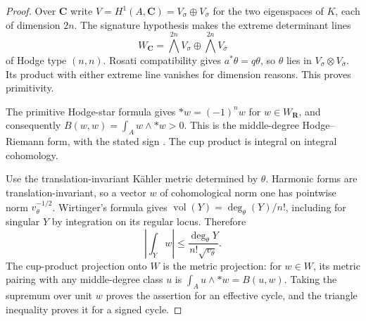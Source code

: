 \documentclass[11pt]{article}
\theoremstyle{definition}
\theoremstyle{remark}
\newcommand{\R}{\mathbf R}
\newcommand{\C}{\mathbf C}
\begin{document}
\begin{proof}
Over $\C$ write $V=H^1(A,\C)=V_\sigma\oplus V_{\bar\sigma}$ for the two eigenspaces of $K$, each of dimension $2n$. The signature hypothesis makes the extreme determinant lines
\[
 W_\C=\bigwedge^{2n}V_\sigma\oplus\bigwedge^{2n}V_{\bar\sigma}
\]
of Hodge type $(n,n)$. Rosati compatibility gives $a^*\theta=q\theta$, so $\theta$ lies in $V_\sigma\otimes V_{\bar\sigma}$. Its product with either extreme line vanishes for dimension reasons. This proves primitivity.

The primitive Hodge-star formula gives $*w=(-1)^nw$ for $w\in W_\R$, and consequently $B(w,w)=\int_A w\wedge*w>0$. This is the middle-degree Hodge--Riemann form, with the stated sign \cite[Theorem~5.42 and (5.43)]{Ballmann}. The cup product is integral on integral cohomology.

Use the translation-invariant K\"ahler metric determined by $\theta$. Harmonic forms are translation-invariant, so a vector $w$ of cohomological norm one has pointwise norm $v_\theta^{-1/2}$. Wirtinger's formula gives $\operatorname{vol}(Y)=\deg_\theta(Y)/n!$, including for singular $Y$ by integration on its regular locus. Therefore
\[
 \left|\int_Yw\right|\leq\frac{\deg_\theta Y}{n!\sqrt{v_\theta}}.
\]
The cup-product projection onto $W$ is the metric projection: for $w\in W$, its metric pairing with any middle-degree class $u$ is $\int_Au\wedge*w=B(u,w)$. Taking the supremum over unit $w$ proves the assertion for an effective cycle, and the triangle inequality proves it for a signed cycle.
\end{proof}
\end{document}
